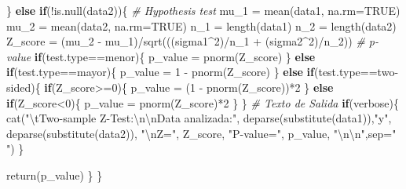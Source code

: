 \documentclass[]{article}
\newenvironment{Shaded}{\begin{snugshade}}{\end{snugshade}}
\newcommand{\AttributeTok}[1]{\textcolor[rgb]{0.77,0.63,0.00}{#1}}
\newcommand{\CommentTok}[1]{\textcolor[rgb]{0.56,0.35,0.01}{\textit{#1}}}
\newcommand{\ConstantTok}[1]{\textcolor[rgb]{0.00,0.00,0.00}{#1}}
\newcommand{\ControlFlowTok}[1]{\textcolor[rgb]{0.13,0.29,0.53}{\textbf{#1}}}
\newcommand{\DecValTok}[1]{\textcolor[rgb]{0.00,0.00,0.81}{#1}}
\newcommand{\FunctionTok}[1]{\textcolor[rgb]{0.00,0.00,0.00}{#1}}
\newcommand{\NormalTok}[1]{#1}
\newcommand{\OtherTok}[1]{\textcolor[rgb]{0.56,0.35,0.01}{#1}}
\newcommand{\SpecialCharTok}[1]{\textcolor[rgb]{0.00,0.00,0.00}{#1}}
\newcommand{\StringTok}[1]{\textcolor[rgb]{0.31,0.60,0.02}{#1}}
\begin{document}
\begin{Shaded}
\begin{Highlighting}[]
\NormalTok{  \}}
  \ControlFlowTok{else} \ControlFlowTok{if}\NormalTok{(}\SpecialCharTok{!}\FunctionTok{is.null}\NormalTok{(data2))\{}
    \CommentTok{\# Hypothesis test}
\NormalTok{    mu\_1 }\OtherTok{=} \FunctionTok{mean}\NormalTok{(data1, }\AttributeTok{na.rm=}\ConstantTok{TRUE}\NormalTok{)}
\NormalTok{    mu\_2 }\OtherTok{=} \FunctionTok{mean}\NormalTok{(data2, }\AttributeTok{na.rm=}\ConstantTok{TRUE}\NormalTok{)}
\NormalTok{    n\_1 }\OtherTok{=} \FunctionTok{length}\NormalTok{(data1)}
\NormalTok{    n\_2 }\OtherTok{=} \FunctionTok{length}\NormalTok{(data2)}
\NormalTok{    Z\_score }\OtherTok{=}\NormalTok{ (mu\_2 }\SpecialCharTok{{-}}\NormalTok{ mu\_1)}\SpecialCharTok{/}\FunctionTok{sqrt}\NormalTok{(((sigma1}\SpecialCharTok{\^{}}\DecValTok{2}\NormalTok{)}\SpecialCharTok{/}\NormalTok{n\_1 }\SpecialCharTok{+}\NormalTok{  (sigma2}\SpecialCharTok{\^{}}\DecValTok{2}\NormalTok{)}\SpecialCharTok{/}\NormalTok{n\_2))}
    \CommentTok{\# p{-}value}
    \ControlFlowTok{if}\NormalTok{(test.type}\SpecialCharTok{==}\StringTok{\textquotesingle{}menor\textquotesingle{}}\NormalTok{)\{}
\NormalTok{      p\_value }\OtherTok{=} \FunctionTok{pnorm}\NormalTok{(Z\_score)}
\NormalTok{    \}}
    \ControlFlowTok{else} \ControlFlowTok{if}\NormalTok{(test.type}\SpecialCharTok{==}\StringTok{\textquotesingle{}mayor\textquotesingle{}}\NormalTok{)\{}
\NormalTok{      p\_value }\OtherTok{=} \DecValTok{1} \SpecialCharTok{{-}} \FunctionTok{pnorm}\NormalTok{(Z\_score)}
\NormalTok{    \}}
    \ControlFlowTok{else} \ControlFlowTok{if}\NormalTok{(test.type}\SpecialCharTok{==}\StringTok{\textquotesingle{}two{-}sided\textquotesingle{}}\NormalTok{)\{}
      \ControlFlowTok{if}\NormalTok{(Z\_score}\SpecialCharTok{\textgreater{}=}\DecValTok{0}\NormalTok{)\{}
\NormalTok{        p\_value }\OtherTok{=}\NormalTok{ (}\DecValTok{1} \SpecialCharTok{{-}} \FunctionTok{pnorm}\NormalTok{(Z\_score))}\SpecialCharTok{*}\DecValTok{2}
\NormalTok{      \}}
      \ControlFlowTok{else} \ControlFlowTok{if}\NormalTok{(Z\_score}\SpecialCharTok{\textless{}}\DecValTok{0}\NormalTok{)\{}
\NormalTok{        p\_value }\OtherTok{=} \FunctionTok{pnorm}\NormalTok{(Z\_score)}\SpecialCharTok{*}\DecValTok{2}
\NormalTok{      \}}
\NormalTok{    \}}
    \CommentTok{\# Texto de Salida}
    \ControlFlowTok{if}\NormalTok{(verbose)\{}
      \FunctionTok{cat}\NormalTok{(}\StringTok{"}\SpecialCharTok{\textbackslash{}t}\StringTok{Two{-}sample Z{-}Test:}\SpecialCharTok{\textbackslash{}n\textbackslash{}n}\StringTok{Data analizada:"}\NormalTok{,}
                      \FunctionTok{deparse}\NormalTok{(}\FunctionTok{substitute}\NormalTok{(data1)),}\StringTok{"y"}\NormalTok{,}
                      \FunctionTok{deparse}\NormalTok{(}\FunctionTok{substitute}\NormalTok{(data2)), }\StringTok{"}\SpecialCharTok{\textbackslash{}n}\StringTok{Z="}\NormalTok{, }
\NormalTok{                      Z\_score, }\StringTok{"P{-}value="}\NormalTok{, p\_value, }\StringTok{"}\SpecialCharTok{\textbackslash{}n\textbackslash{}n}\StringTok{"}\NormalTok{,}\AttributeTok{sep=}\StringTok{" "}\NormalTok{)}
\NormalTok{    \}}
  
    \FunctionTok{return}\NormalTok{(p\_value)}
\NormalTok{  \}}
\NormalTok{\}}
\end{Highlighting}
\end{Shaded}
\end{document}
